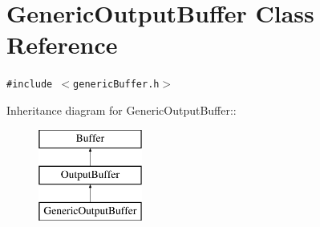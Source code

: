 \hypertarget{classGenericOutputBuffer}{
\section{GenericOutputBuffer Class Reference}
\label{classGenericOutputBuffer}
}
{\tt \#include $<$genericBuffer.h$>$}

Inheritance diagram for GenericOutputBuffer::\begin{figure}[H]
\begin{center}
\leavevmode
\includegraphics[height=3cm]{classGenericOutputBuffer}
\end{center}
\end{figure}
